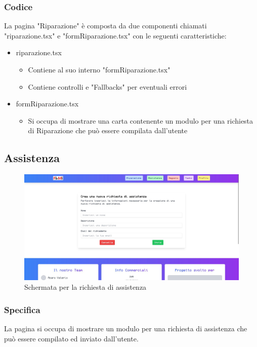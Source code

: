 \documentclass{report}
\begin{document}
\subsubsection*{Codice}
La pagina "Riparazione" è composta da due componenti chiamati "riparazione.tsx" e "formRiparazione.tsx" con le seguenti caratteristiche:
\begin{itemize}
	\item riparazione.tsx
	\begin{itemize}
		\item Contiene al suo interno "formRiparazione.tsx"
		\item Contiene controlli e "Fallbacks" per eventuali errori
	\end{itemize}
	\item formRiparazione.tsx
	\begin{itemize}
		\item Si occupa di mostrare una carta contenente un modulo per una richiesta di Riparazione che può essere compilata dall'utente
	\end{itemize}
\end{itemize}


\subsection{Assistenza}

\begin{figure}[H]
	\centering\includegraphics[width=1\textwidth]{images/microservizio-home/frontend/assistenza.jpg}
	\caption{Schermata per la richiesta di assistenza}
\end{figure}
\subsubsection*{Specifica}
La pagina si occupa di mostrare un modulo per una richiesta di assistenza che può essere compilato ed inviato dall'utente.\\ 
\end{document}
